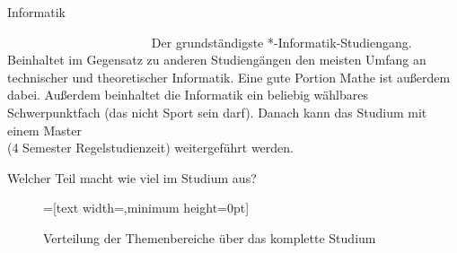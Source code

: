 
\begin{Huge}
    Informatik
\end{Huge}
\begin{exampleblock}{\textcolor{white}{Was ist der Studiengang?}}
    Der grundständigste *-Informatik-Studiengang. Beinhaltet im Gegensatz zu anderen Studiengängen den meisten Umfang an technischer und theoretischer Informatik. Eine gute Portion Mathe ist außerdem dabei. Außerdem beinhaltet die Informatik ein beliebig wählbares Schwerpunktfach (das nicht Sport sein darf). Danach kann das Studium mit einem Master \\ (4 Semester Regelstudienzeit) weitergeführt werden.
\end{exampleblock}	

\begin{block}{Welcher Teil macht wie viel im Studium aus?}
    \begin{figure}[h!]
        \begin{minipage}{\linewidth}
            \centering
            =[text width={},minimum height=0pt]
        \end{minipage}
        
        \caption{Verteilung der Themenbereiche über das komplette Studium}
    \end{figure}	
\end{block}%

